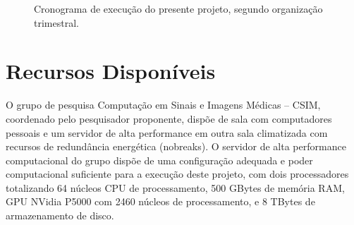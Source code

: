 \documentclass[
	12pt,				%
	openany,oneside,
	a4paper,			%
	english,			%
	brazil,				%
	]{abntex2}
\begin{document}
\begin{figure}
\begin{ganttchart}
\end{ganttchart}
\caption{\label{figcronograma}Cronograma de execução do presente projeto, segundo organização
trimestral.}

\end{figure}

\chapter{Recursos Disponíveis}
O grupo de pesquisa Computação em Sinais e Imagens Médicas – CSIM, coordenado pelo pesquisador proponente, dispõe de sala com computadores pessoais e um servidor de alta performance em outra sala climatizada com recursos de redundância energética (nobreaks). O servidor de alta performance computacional do grupo dispõe de uma configuração adequada e poder computacional suficiente para a execução deste projeto, com dois processadores totalizando 64 núcleos CPU de processamento, 500 GBytes de memória RAM, GPU NVidia P5000 com 2460 núcleos de processamento, e 8 TBytes de armazenamento de disco.





\postextual



%
%

\end{document}
